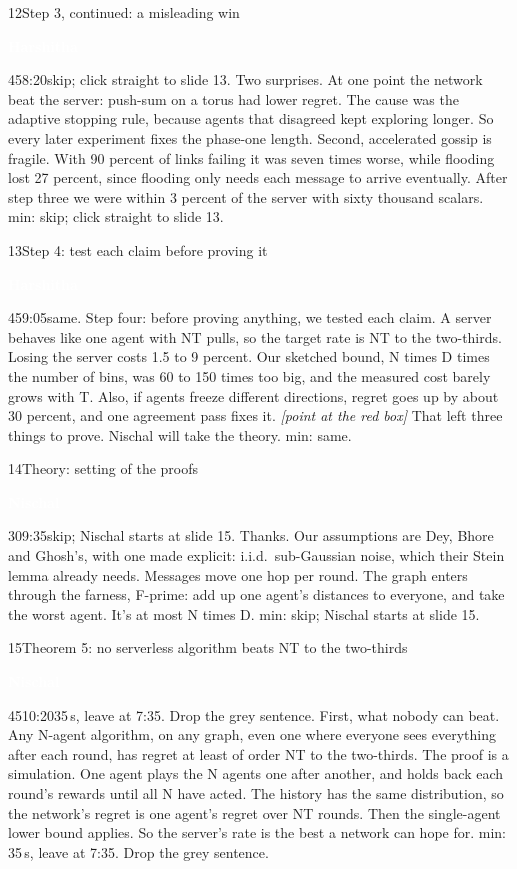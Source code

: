 \documentclass[12pt,a4paper]{article}
\newcommand{\Hb}{\colorbox{harsh}{\strut\textcolor{white}{\textbf{\small Harshitha}}}}
\newcommand{\Nb}{\colorbox{nisch}{\strut\textcolor{white}{\textbf{\small Nischal}}}}
\newcommand{\cut}[1]{\textcolor{cutc}{#1}}
\newcommand{\cue}[1]{{\small\itshape\color{bar}[#1]}}
\newenvironment{slide}[6]
  {\begin{slidebox}{#1}{#2}{#3}{#4}{#5}{#6}\gdef\fifteen{#6}}
  {\tcblower 15 min: \fifteen\end{slidebox}}
\begin{document}
\begin{slide}{12}{Step 3, continued: a misleading win}{\Hb}{45}{8:20}{skip; click straight to slide 13.}
Two surprises. At one point the network beat the server: push-sum on a torus had lower regret. The cause was the
adaptive stopping rule, because agents that disagreed kept exploring longer. So every later experiment fixes the
phase-one length. Second, accelerated gossip is fragile. With 90 percent of links failing it was seven times worse,
while flooding lost 27 percent, since flooding only needs each message to arrive eventually. After step three we were
within 3 percent of the server with sixty thousand scalars.
\end{slide}

\begin{slide}{13}{Step 4: test each claim before proving it}{\Hb}{45}{9:05}{same.}
Step four: before proving anything, we tested each claim. A server behaves like one agent with NT pulls, so the target
rate is NT to the two-thirds. Losing the server costs 1.5 to 9 percent. Our sketched bound, N times D times the number
of bins, was 60 to 150 times too big, and the measured cost barely grows with T. Also, if agents freeze different
directions, regret goes up by about 30 percent, and one agreement pass fixes it. \cue{point at the red box} That left
three things to prove. Nischal will take the theory.
\end{slide}

\begin{slide}{14}{Theory: setting of the proofs}{\Nb}{30}{9:35}{skip; Nischal starts at slide 15.}
Thanks. Our assumptions are Dey, Bhore and Ghosh's, with one made explicit: i.i.d.\ sub-Gaussian noise, which their
Stein lemma already needs. Messages move one hop per round. The graph enters through the farness, F-prime: add up one
agent's distances to everyone, and take the worst agent. It's at most N times D.
\end{slide}

\begin{slide}{15}{Theorem 5: no serverless algorithm beats NT to the two-thirds}{\Nb}{45}{10:20}{35\,s, leave at 7:35. Drop the grey sentence.}
First, what nobody can beat. Any N-agent algorithm, on any graph, even one where everyone sees everything after each
round, has regret at least of order NT to the two-thirds. The proof is a simulation. One agent plays the N agents one
after another, and holds back each round's rewards until all N have acted. The history has the same distribution, so
the network's regret is one agent's regret over NT rounds. \cut{Then the single-agent lower bound applies.} So the
server's rate is the best a network can hope for.
\end{slide}
\end{document}
